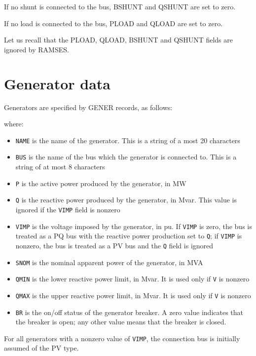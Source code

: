 If no shunt is connected to the bus, BSHUNT and QSHUNT are set to zero.

If no load is connected to the bus, PLOAD and QLOAD are set to zero.

Let us recall that the PLOAD, QLOAD, BSHUNT and QSHUNT fields are ignored by RAMSES.


\section{Generator data}

Generators are specified by GENER records, as follows:

\hspace*{5ex}{\tt GENER NAME BUS P Q VIMP SNOM QMIN QMAX BR ;}

where:
\begin{itemize}
\item {\tt NAME} is the name of the generator. This is a string of a most 20 characters
\item {\tt BUS} is the name of the bus which the generator is connected to. This is a string of at most 8 characters
\item {\tt P} is the  active power produced by the generator, in MW
\item {\tt Q} is the reactive power produced by the generator, in Mvar. This value is ignored if the {\tt VIMP} field is nonzero
\item {\tt VIMP} is the voltage imposed by the generator, in pu. If {\tt VIMP} is zero, the bus is
treated as a PQ bus with the reactive power production set to {\tt Q}; if {\tt VIMP} is nonzero, the bus is treated as a PV bus and the {\tt Q} field is ignored
\item {\tt SNOM} is the nominal apparent power of the generator, in MVA
\item {\tt QMIN} is the lower reactive power limit, in Mvar. It is used only if {\tt V} is nonzero
\item {\tt QMAX} is the upper reactive power limit, in Mvar. It is used only if {\tt V} is nonzero
\item {\tt BR} is the on/off status of the generator breaker. A zero value indicates that the
breaker is open; any other value means that the breaker is closed.
\end{itemize}

For all generators with a nonzero value of {\tt VIMP}, the connection bus is initially assumed of the PV type.

